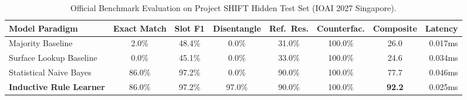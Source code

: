 \begin{table}[t]
\centering
\small
\caption{Official Benchmark Evaluation on Project SHIFT Hidden Test Set (IOAI 2027 Singapore).}
\label{tab:shift_benchmark_results}
\begin{tabular}{lccccccr}
\toprule
\textbf{Model Paradigm} & \textbf{Exact Match} & \textbf{Slot F1} & \textbf{Disentangle} & \textbf{Ref.~Res.} & \textbf{Counterfac.} & \textbf{Composite} & \textbf{Latency} \\
\midrule
Majority Baseline & 2.0\% & 48.4\% & 0.0\% & 31.0\% & 100.0\% & 26.0 & 0.017ms \\
Surface Lookup Baseline & 0.0\% & 45.1\% & 0.0\% & 33.0\% & 100.0\% & 24.6 & 0.034ms \\
Statistical Naive Bayes & 86.0\% & 97.2\% & 0.0\% & 90.0\% & 100.0\% & 77.7 & 0.046ms \\
\textbf{Inductive Rule Learner} & 86.0\% & 97.2\% & 97.0\% & 90.0\% & 100.0\% & \textbf{92.2} & 0.025ms \\
\bottomrule
\end{tabular}
\end{table}
